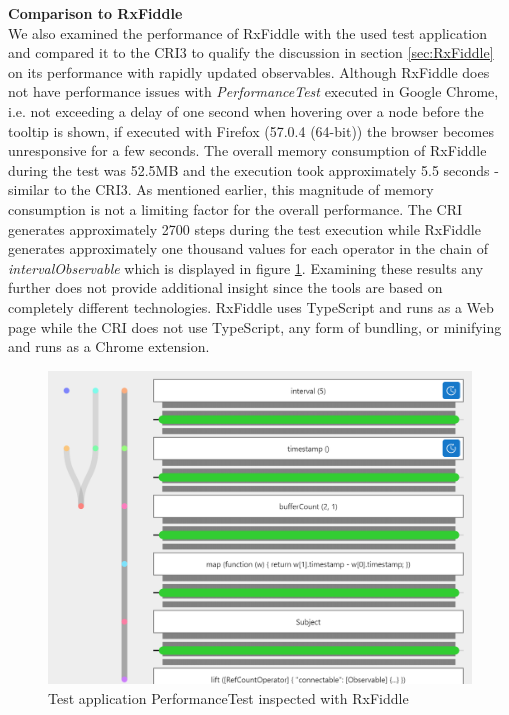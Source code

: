 	\textbf{Comparison to RxFiddle}\\
	We also examined the performance of RxFiddle with the used test application and compared it to the CRI3 to qualify the discussion in section \ref{sec:RxFiddle} on its performance with rapidly updated observables.
	Although RxFiddle does not have performance issues  with \emph{PerformanceTest} executed in Google Chrome, i.e. not exceeding a delay of one second when hovering over a node before the tooltip is shown, if executed with Firefox (57.0.4 (64-bit)) the browser becomes unresponsive for a few seconds. The overall memory consumption of RxFiddle during the test was 52.5MB and the execution took approximately 5.5 seconds - similar to the CRI3. As mentioned earlier, this magnitude of memory consumption is not a limiting factor for the overall performance. The CRI generates approximately 2700 steps during the test execution while RxFiddle generates approximately one thousand values for each operator in the chain of \emph{intervalObservable} which is displayed in figure \ref{fig:RxFiddlePerformance}. Examining these results any further does not provide additional insight since the tools are based on completely different technologies. RxFiddle uses TypeScript and runs as a Web page while the CRI does not use TypeScript, any form of bundling, or minifying and runs as a Chrome extension.
	\begin{figure}[!h]
		\centering
		\includegraphics[scale=0.7,trim=0 0 0 0]{gfx/RxFiddleWithTimer.png}
		\caption{Test application PerformanceTest inspected with RxFiddle}
		\label{fig:RxFiddlePerformance}
	\end{figure}
	
